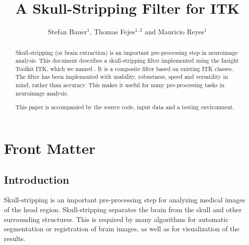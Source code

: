 \documentclass{InsightArticle}
\title{A Skull-Stripping Filter for ITK}
\author{Stefan Bauer$^{1}$, Thomas Fejes$^{1,2}$ and Mauricio Reyes$^{1}$}
\newcommand{\IJhandlerIDnumber}{1338}
\begin{document}
%
% 
\IJhandlefooter{\IJhandlerIDnumber}


\ifpdf
\else
\fi


\maketitle


\ifhtml
\chapter*{Front Matter\label{front}}
\fi


\begin{abstract}
\noindent

Skull-stripping (or brain extraction) is an important pre-processing step in neuroimage analysis.
This document describes a skull-stripping filter implemented using the Insight Toolkit
ITK, which we named  . It is a composite filter based on existing ITK classes. The filter has been implemented with usability, robustness, speed and versatility in mind, rather than accuracy. This makes it useful for many pre-processing tasks in neuroimage analysis.

This paper is accompanied by the source code, input data and a testing environment.
\end{abstract}

\IJhandlenote{\IJhandlerIDnumber}

\tableofcontents


\section{Introduction}

Skull-stripping is an important pre-processing step for analyzing medical images of the head region. Skull-stripping separates the brain from the skull and other surrounding structures. This is required by many algorithms for automatic segmentation or registration of brain images, as well as for visualization of the results.
\end{document}
